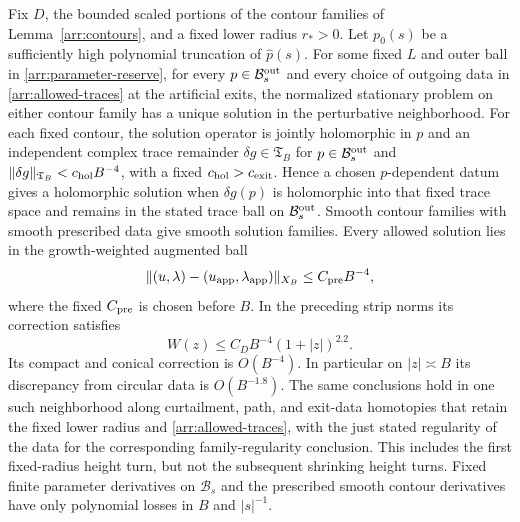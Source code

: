\begin{proposition}\label{arr:preliminary-solves}
Fix \(D\), the bounded scaled portions of the contour families of
Lemma~\ref{arr:contours}, and a fixed lower radius \(r_*>0\).
Let \(p_0(s)\) be a sufficiently high polynomial truncation of
\(\widehat p(s)\).  For some fixed \(L\) and outer ball in
\eqref{arr:parameter-reserve}, for every \(p\in\mathcal B_s^{\rm out}\)
and every choice of outgoing data in \eqref{arr:allowed-traces} at
the artificial exits, the normalized stationary problem on either
contour family has a unique solution in the perturbative neighborhood.
For each fixed contour, the solution operator is jointly holomorphic
in \(p\) and an independent complex trace remainder
\(\delta g\in\mathfrak T_B\) for \(p\in\mathcal B_s^{\rm out}\) and
\(\|\delta g\|_{\mathfrak T_B}<c_{\rm hol}B^{-4}\), with a fixed
\(c_{\rm hol}>c_{\rm exit}\).  Hence a chosen \(p\)-dependent datum gives a holomorphic
solution when \(\delta g(p)\) is holomorphic into that fixed trace
space and remains in the stated trace ball on \(\mathcal B_s^{\rm out}\).
Smooth contour families with smooth prescribed data give
smooth solution families.  Every allowed solution lies in the
growth-weighted augmented ball
\[
 \|(u,\lambda)-(u_{\rm app},\lambda_{\rm app})\|_{X_B}
       \le C_{\rm pre}B^{-4},
\]
where the fixed $C_{\rm pre}$ is chosen before $B$.  In the preceding
strip norms its correction satisfies
\begin{equation}\label{arr:preliminary-bound}
 W(z)\le C_D B^{-4}(1+|z|)^{2.2}.
\end{equation}
Its compact and conical correction is \(O(B^{-4})\).
In particular on \(|z|\asymp B\) its discrepancy from circular data
is \(O(B^{-1.8})\).
The same conclusions hold in one such neighborhood along curtailment,
path, and exit-data homotopies that retain the fixed lower radius and
\eqref{arr:allowed-traces}, with the just stated regularity of the data
for the corresponding family-regularity conclusion.  This includes the first fixed-radius
height turn, but not the subsequent shrinking height turns.  Fixed
finite parameter derivatives on $\mathcal B_s$ and the prescribed
smooth contour derivatives have only polynomial losses in \(B\) and
\(|s|^{-1}\).
\end{proposition}

